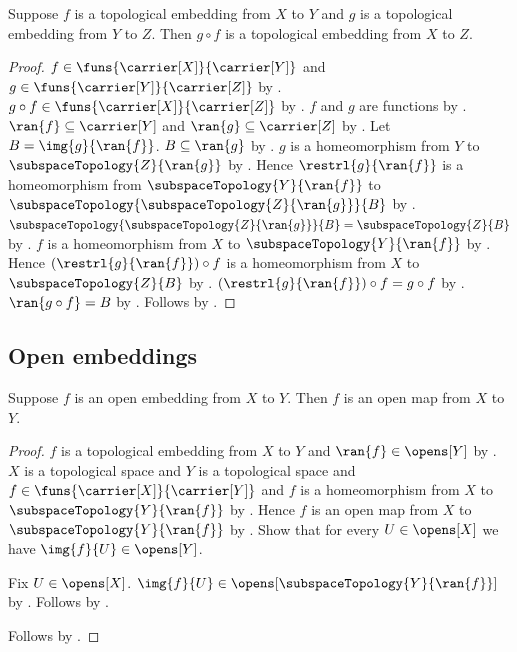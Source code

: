 \begin{theorem}\label{topological_embedding_composition}
    Suppose $f$ is a topological embedding from $X$ to $Y$ and
        $g$ is a topological embedding from $Y$ to $Z$.
    Then $g\circ f$ is a topological embedding from $X$ to $Z$.
\end{theorem}
\begin{proof}
    $f\in\funs{\carrier[X]}{\carrier[Y]}$ and
        $g\in\funs{\carrier[Y]}{\carrier[Z]}$ by
        .
    $g\circ f\in\funs{\carrier[X]}{\carrier[Z]}$ by .
    $f$ and $g$ are functions by .
    $\ran{f}\subseteq\carrier[Y]$ and
        $\ran{g}\subseteq\carrier[Z]$ by .
    Let $B=\img{g}{\ran{f}}$.
    $B\subseteq\ran{g}$ by .
    $g$ is a homeomorphism from $Y$ to $\subspaceTopology{Z}{\ran{g}}$
        by .
    Hence $\restrl{g}{\ran{f}}$ is a homeomorphism from
        $\subspaceTopology{Y}{\ran{f}}$ to
        $\subspaceTopology{\subspaceTopology{Z}{\ran{g}}}{B}$ by
        .
    $\subspaceTopology{\subspaceTopology{Z}{\ran{g}}}{B}
        =\subspaceTopology{Z}{B}$ by .
    $f$ is a homeomorphism from $X$ to $\subspaceTopology{Y}{\ran{f}}$
        by .
    Hence $(\restrl{g}{\ran{f}})\circ f$ is a homeomorphism from
        $X$ to $\subspaceTopology{Z}{B}$ by
        .
    $(\restrl{g}{\ran{f}})\circ f=g\circ f$ by
        .
    $\ran{g\circ f}=B$ by .
    Follows by .
\end{proof}

\subsection{Open embeddings}

\begin{theorem}\label{open_embedding_is_open_map}
    Suppose $f$ is an open embedding from $X$ to $Y$.
    Then $f$ is an open map from $X$ to $Y$.
\end{theorem}
\begin{proof}
    $f$ is a topological embedding from $X$ to $Y$ and
        $\ran{f}\in\opens[Y]$ by .
    $X$ is a topological space and $Y$ is a topological space and
        $f\in\funs{\carrier[X]}{\carrier[Y]}$ and
        $f$ is a homeomorphism from $X$ to $\subspaceTopology{Y}{\ran{f}}$
        by .
    Hence $f$ is an open map from $X$ to $\subspaceTopology{Y}{\ran{f}}$
        by .
    Show that for every $U\in\opens[X]$ we have $\img{f}{U}\in\opens[Y]$.
    \begin{subproof}
        Fix $U\in\opens[X]$.
        $\img{f}{U}\in\opens[\subspaceTopology{Y}{\ran{f}}]$ by
            .
        Follows by .
    \end{subproof}
    Follows by .
\end{proof}

